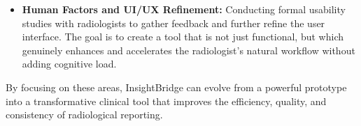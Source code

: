 \begin{itemize}
    \item \textbf{Human Factors and UI/UX Refinement:} Conducting formal usability studies with radiologists to gather feedback and further refine the user interface. The goal is to create a tool that is not just functional, but which genuinely enhances and accelerates the radiologist's natural workflow without adding cognitive load.
\end{itemize}

By focusing on these areas, InsightBridge can evolve from a powerful prototype into a transformative clinical tool that improves the efficiency, quality, and consistency of radiological reporting. 